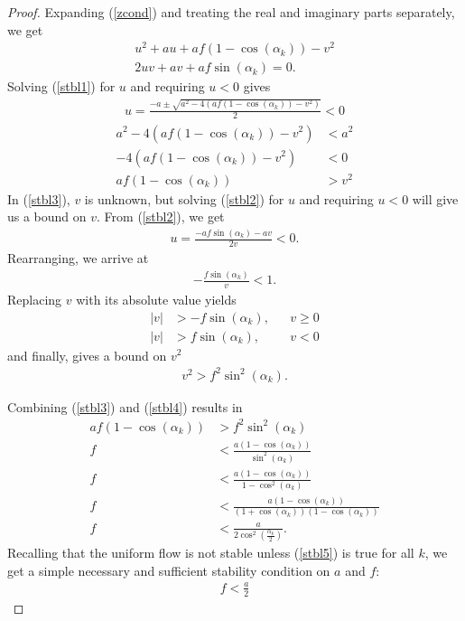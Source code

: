 \documentclass[10pt,twocolumn]{article}
\theoremstyle{ss}
\begin{document}
\begin{proof}
Expanding (\ref{zcond}) and treating the real and imaginary parts separately, we get
\begin{gather}
\label{stbl1} u^2 + au + af(1 - \cos(\alpha_k) ) - v^2\\
\label{stbl2} 2uv + av + af\sin(\alpha_k) = 0. 
\end{gather}
Solving (\ref{stbl1}) for $u$ and requiring $u<0$ gives
\begin{gather}
u = \frac{-a \pm \sqrt{a^2 - 4(af(1-\cos(\alpha_k))-v^2)}}{2} < 0
\end{gather}
\begin{align}
 a^2 - 4(af(1-\cos(\alpha_k))-v^2) &< a^2\\
 - 4(af(1-\cos(\alpha_k))-v^2) &< 0\\
\label{stbl3}  af(1-\cos(\alpha_k)) &> v^2
\end{align}
In (\ref{stbl3}), $v$ is unknown, but solving (\ref{stbl2}) for $u$ and requiring $u<0$ will give us a bound on $v$. From (\ref{stbl2}), we get
\begin{gather}
u = \frac{-af\sin(\alpha_k)-av}{2v} < 0.
\end{gather}
Rearranging, we arrive at
\begin{gather}
-\frac{f\sin(\alpha_k)}{v} < 1.
\end{gather}
Replacing $v$ with its absolute value yields
\begin{align}
|v|&>-f\sin(\alpha_k),& &v \geq 0\\
|v|&>f\sin(\alpha_k),& &v<0
\end{align}
and finally, gives a bound on $v^2$
\begin{gather}
\label{stbl4} v^2 > f^2\sin^2(\alpha_k).
\end{gather}

Combining (\ref{stbl3}) and (\ref{stbl4}) results in
\begin{align}
af(1-\cos(\alpha_k)) &> f^2\sin^2(\alpha_k)\\
 f &< \frac{a(1-\cos(\alpha_k))}{\sin^2(\alpha_k)}\\
 f &< \frac{a(1-\cos(\alpha_k))}{1-\cos^2(\alpha_k)}\\
 f &< \frac{a(1-\cos(\alpha_k))}{(1+\cos(\alpha_k))(1-\cos(\alpha_k))}\\
\label{stbl5}  f &< \frac{a}{2\cos^2(\frac{\alpha_k}{2})}.
\end{align}
Recalling that the uniform flow is not stable unless (\ref{stbl5}) is true for all $k$, we get a simple necessary and sufficient stability condition on $a$ and $f$:
\begin{gather}
f < \frac{a}{2}
\end{gather}
\end{proof}
\end{document}
